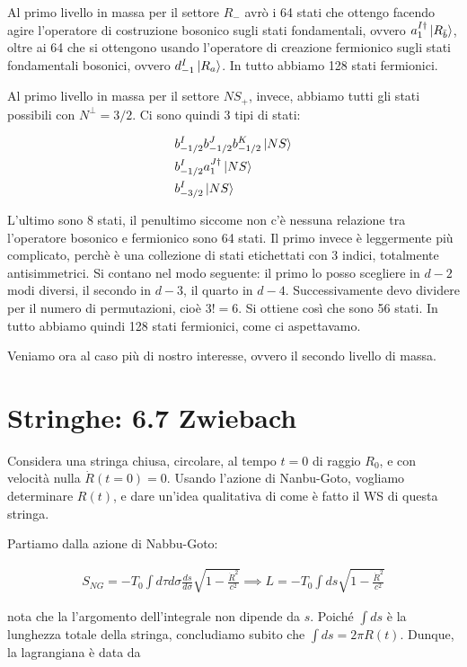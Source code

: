 \documentclass{report}
\begin{document}
Al primo livello in massa per il settore \(R_-\) avrò i 64 stati che ottengo facendo agire l'operatore di costruzione bosonico sugli stati fondamentali, ovvero \(a^{I\dagger}_1\ket{R_{\bar{b}}}\), oltre ai 64 che si ottengono usando l'operatore di creazione fermionico sugli stati fondamentali bosonici, ovvero \(d_{-1}^I \ket{R_a}\). In tutto abbiamo 128 stati fermionici. 

Al primo livello in massa per il settore \(NS_+\), invece, abbiamo tutti gli stati possibili con \(N^\perp = 3/2\). Ci sono quindi 3 tipi di stati: 

\begin{align}
    &b_{-1/2}^I b_{-1/2}^J b_{-1/2}^K \ket{NS} \notag \\ 
    &b_{-1/2}^I a_{1}^{J\dagger} \ket{NS} \notag \\
    &b_{-3/2}^I \ket{NS}
\end{align}

L'ultimo sono 8 stati, il penultimo siccome non c'è nessuna relazione tra l'operatore bosonico e fermionico sono 64 stati. Il primo invece è leggermente più complicato, perchè è una collezione di stati etichettati con 3 indici, totalmente antisimmetrici. Si contano nel modo seguente: il primo lo posso scegliere in \(d-2\) modi diversi, il secondo in \(d-3\), il quarto in \(d-4\). Successivamente devo dividere per il numero di permutazioni, cioè \(3! = 6\). Si ottiene così che sono 56 stati. In tutto abbiamo quindi 128 stati fermionici, come ci aspettavamo. 

Veniamo ora al caso più di nostro interesse, ovvero il secondo livello di massa. 

\section{Stringhe: 6.7 Zwiebach}

Considera una stringa chiusa, circolare, al tempo \(t=0\) di raggio \(R_0\), e con velocità nulla \(\dot{R}(t=0) = 0\). Usando l'azione di Nanbu-Goto, vogliamo determinare \(R(t)\), e dare un'idea qualitativa di come è fatto il WS di questa stringa. 

Partiamo dalla azione di Nabbu-Goto: 

\begin{align}
    S_{NG} = -T_0 \int d\tau d\sigma \frac{ds}{d\sigma}\sqrt{1-\frac{\dot{R}^2}{c^2}} \implies L = -T_0\int ds \sqrt{1-\frac{\dot{R}^2}{c^2}}
\end{align}

nota che la l'argomento dell'integrale non dipende da \(s\). Poiché \(\int ds\) è la lunghezza totale della stringa, concludiamo subito che \(\int ds = 2\pi R(t)\). Dunque, la lagrangiana è data da 
\end{document}
